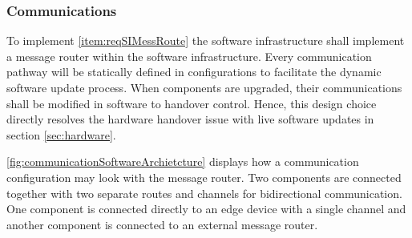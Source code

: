 \subsubsection{Communications}
To implement \autoref{item:reqSIMessRoute} the software infrastructure shall implement a message router within the software infrastructure. Every communication pathway will be statically defined in configurations to facilitate the dynamic software update process. When components are upgraded, their communications shall be modified in software to handover control. Hence, this design choice directly resolves the hardware handover issue with live software updates in section \ref{sec:hardware}.

\autoref{fig:communicationSoftwareArchietcture} displays how a communication configuration may look with the message router. Two components are connected together with two separate routes and channels for bidirectional communication. One component is connected directly to an edge device with a single channel and another component is connected to an external message router.

